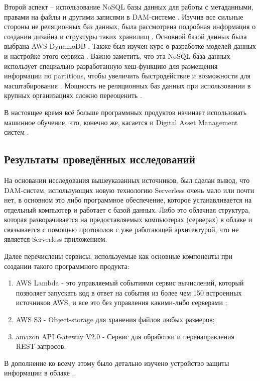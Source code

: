 Второй аспект – использование NoSQL \cite{NoSqlDesignEvolution} базы данных для работы с метаданными, правами на файлы и другими записями в DAM-системе \cite{NoSQLFramework}. Изучив все сильные стороны не реляционных баз данных, была рассмотрена подробная информация о создании дизайна и структуры таких хранилищ \cite{NoSqlDesign}. Основной базой данных была выбрана AWS DynamoDB \cite{AwsDynamoDB}. Также был изучен курс о разработке моделей данных и настройке этого сервиса \cite{CloudGuruCourses}. Важно заметить, что эта NoSQL база данных использует специально разработанную хеш-функцию для размещения информации по partitions, чтобы увеличить быстродействие и возможности для масштабирования \cite{NoSqlDataPartition}.
Мощность не реляционных баз данных при использовании в крупных организациях сложно переоценить \cite{NoSqlForEnterprise}.

В настоящее время всё больше программных продуктов начинает использовать машинное обучение, что, конечно же, касается и Digital Asset Management систем \cite{DamAndAi}.

\subsection{Результаты проведённых исследований}
На основании исследования вышеуказанных источников, был сделан вывод, что DAM-систем, использующих новую технологию Serverless \cite{MicrosoftServerlessOnAws} очень мало или почти нет, в основном это либо программное обеспечение, которое устанавливается на отдельный компьютер и работает с базой данных. Либо это облачная структура, которая разворачивается на предоставляемых компьютерах (серверах) в облаке \cite{AwsCloud} и связывается с помощью протоколов с уже работающей архитектурой, что не является Serverless приложением. 

Далее перечислены сервисы, используемые как основные компоненты при создании такого программного продукта:
\begin{enumerate}
\item AWS Lambda \cite{AwsLambda} - это управляемый событиями сервис вычислений, который позволяет запускать код в ответ на события из более чем 150 встроенных источников AWS, и все это без управления какими-либо серверами \cite{ServerlessNodeJs};

\item AWS S3 \cite{AwsS3} - Object-storage для хранения файлов любых размеров;

\item amazon API Gateway V2.0 \cite{AwsGateway} - Сервис для обработки и перенаправления REST-запросов.
\end{enumerate}
В дополнение ко всему этому было детально изучено устройство защиты информации в облаке \cite{CloudSecurity}.


